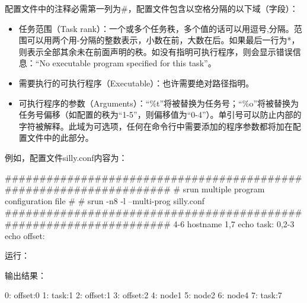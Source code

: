 配置文件中的注释必需第一列为\#，配置文件包含以空格分隔的以下域（字段）：
\begin{itemize}
	\item 任务范围（Task rank）：一个或多个任务秩，多个值的话可以用逗号,分隔。范围可以用两个用-分隔的整数表示，小数在前，大数在后。如果最后一行为*，则表示全部其余未在前面声明的秩。如没有指明可执行程序，则会显示错误信息：``No executable program specified for this task''。
    \item 需要执行的可执行程序（Executable）：也许需要绝对路径指明。
    \item 可执行程序的参数（Arguments）：``\%t''将被替换为任务号；``\%o''将被替换为任务号偏移（如配置的秩为``1-5''，则偏移值为``0-4''）。单引号可以防止内部的字符被解释。此域为可选项，任何在命令行中需要添加的程序参数都将加在配置文件中的此部分。
\end{itemize}
例如，配置文件silly.conf内容为：
\begin{SH}
###################################################################
# srun multiple program configuration file
#
# srun -n8 -l --multi-prog silly.conf
###################################################################
4-6       hostname
1,7       echo  task:%
0,2-3     echo  offset:%
\end{SH}

运行：

输出结果：
\begin{OUT}
0: offset:0
1: task:1
2: offset:1
3: offset:2
4: node1
5: node2
6: node4
7: task:7
\end{OUT}

